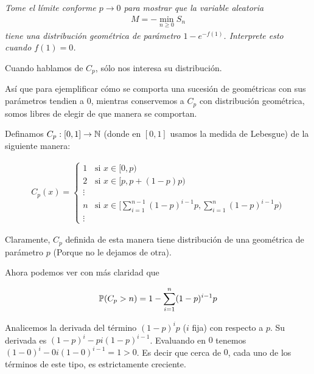 \emph{
    Tome el límite conforme $p\to 0$ para mostrar que la variable aleatoria 
    \begin{align}
        M=-\min_{n\geq 0}S_n
    \end{align}
    tiene una distribuci\'on geom\'etrica de par\'ametro $1-e^{-f(1)}$. Interprete esto cuando $f(1)=0$.
}

Cuando hablamos de $C_p$, sólo nos interesa su distribución.\pn

Así que para ejemplificar cómo se comporta una sucesión de geométricas con sus parámetros tendien a $0$,
mientras conservemos a $C_p$ con distribución geométrica, somos libres de elegir de que manera se comportan.\pn

Definamos $C_p : [0,1] \rightarrow \mathbb{N}$ (donde en $[0,1]$ usamos la medida de Lebesgue) de la siguiente manera:

\begin{align}
    C_{p}(x) = 
        \begin{cases}
            1       & \mbox{si } x \in [0, p)                                                                               \\
            2       & \mbox{si } x \in [p, p + (1-p)p)                                                                      \\
            \vdots  &                                                                                                       \\
            n       & \mbox{si } x \in \bigg[\sum_{i = 1}^{n - 1} (1 - p)^{i - 1}p , \sum_{i = 1}^n (1-p)^{i-1}p \bigg)     \\
            \vdots  &                                               
        \end{cases}
\end{align}

Claramente, $C_p$ definida de esta manera tiene distribución de una geométrica de parámetro $p$ (Porque no le dejamos de otra).\pn

Ahora podemos ver con más claridad que 

\begin{align}
    \mathbb{P}(C_p > n) = 1 - \sum_{i = 1}^n (1-p)^{i-1}p
\end{align}

Analicemos la derivada del término $(1-p)^{i}p$ ($i$ fija) con respecto a $p$. Su derivada es $(1-p)^i - p i (1-p)^{i-1}$.
Evaluando en $0$ tenemos \\
$(1-0)^i - 0 i (1-0)^{i-1} = 1 > 0$. Es decir que cerca de $0$, cada uno de los términos de este tipo, es 
estrictamente creciente.\pn

